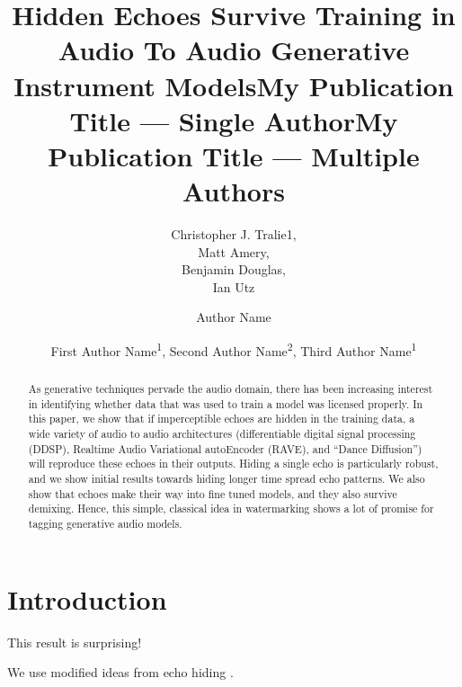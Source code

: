 \documentclass[letterpaper]{article} %
\title{Hidden Echoes Survive Training in Audio To Audio Generative Instrument Models}
\author{
    Christopher J. Tralie{\rm 1},\\
    Matt Amery,\\
    Benjamin Douglas,\\
    Ian Utz
}
\title{My Publication Title --- Single Author}
\author {
    Author Name
}
\title{My Publication Title --- Multiple Authors}
\author {
    First Author Name\textsuperscript{\rm 1},
    Second Author Name\textsuperscript{\rm 2},
    Third Author Name\textsuperscript{\rm 1}
}
\begin{document}
\maketitle

\begin{abstract}
As generative techniques pervade the audio domain, there has been increasing interest in identifying whether data that was used to train a model was licensed properly. In this paper, we show that if imperceptible echoes are hidden in the training data, a wide variety of audio to audio architectures (differentiable digital signal processing (DDSP), Realtime Audio Variational autoEncoder (RAVE), and ``Dance Diffusion'') will reproduce these echoes in their outputs. Hiding a single echo is particularly robust, and we show initial results towards hiding longer time spread echo patterns. We also show that echoes make their way into fine tuned models, and they also survive demixing. Hence, this simple, classical idea in watermarking shows a lot of promise for tagging generative audio models. 

\end{abstract}

%

\section{Introduction}

This result is surprising!

We use modified ideas from echo hiding \cite{gruhl1996echo}.
\end{document}
